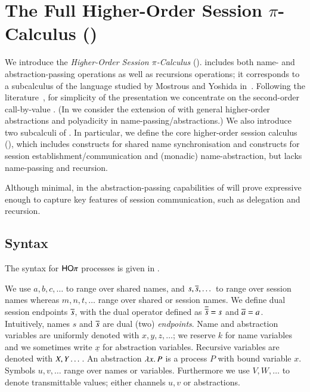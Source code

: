 
\section{The Full Higher-Order Session $\pi$-Calculus (\HOp)}
\label{sec:calculus}

We introduce the 
\emph{Higher-Order Session $\pi$-Calculus} (\HOp).
\HOp includes both name- and abstraction-passing operations
as well as recursions operations; it corresponds to a subcalculus 
of the language
studied by Mostrous and Yoshida
in~\cite{tlca07}. 
Following the literature~\cite{JeffreyR05},
for simplicity of the presentation
we concentrate on the second-order call-by-value \HOp.  
(In  we consider the extension of 
\HOp with general higher-order abstractions 
and polyadicity in name-passing/abstractions.)
We also introduce two subcalculi of \HOp.
In particular, we define the 
core higher-order session
calculus (\HO), which 
includes constructs for shared name synchronisation and 
constructs for session establish\-ment/communication and 
(monadic) name-abstraction, but lacks name-passing and recursion.

Although minimal, in 
the abstraction-passing capabilities of \HOp will prove 
expressive enough to capture key features of session communication, 
such as delegation and recursion.

\subsection{Syntax} 

The syntax for $\mathsf{HO}\pi$ processes is given in .

We use $a,b,c, \dots$ to range over shared names, and
$s, \overline{s}, \dots$ to range over session names
whereas $m, n, t, \dots$ range over shared or session names.
We define dual session endpoints $\overline{s}$,
with the dual operator defined as
$\overline{\overline{s}} = s$ and $\overline{a} = a$.
Intuitively, names $s$ and $\overline{s}$ are dual (two) \emph{endpoints}.
Name and abstraction variables are uniformly denoted with $x, y, z, \dots$;
we reserve $k$ for name variables and we sometimes write $\underline{x}$ for abstraction variables.
Recursive variables are denoted with $X, Y \dots$.
An abstraction $\lambda x.\,P$ is a process $P$ with bound variable $x$.
Symbols $u, v, \dots$ range over names or variables. Furthermore
we use $V, W, \dots$ to denote transmittable values; either channels $u, v$ or
abstractions.

